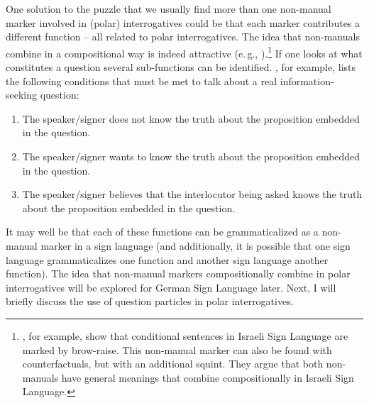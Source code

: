 One solution to the puzzle that we usually find more than one non-manual marker involved in (polar) interrogatives could be that each marker contributes a different function -- all related to polar interrogatives. The idea that non-manuals combine in a compositional way is indeed attractive (e.\,g., \citealt{nespor1999prosody, sandler2006sign, dachkovsky2009visual, herrmann2013modal}).\footnote{ \citet{dachkovsky2009visual}, for example, show that conditional sentences in Israeli Sign Language are marked by brow-raise. This non-manual marker can also be found with counterfactuals, but with an additional squint. They argue that both non-manuals have general meanings that combine compositionally in Israeli Sign Language.} If one looks at what constitutes a question several sub-functions can be identified. \citet[4]{dayal2016questions}, for example, lists the following conditions that must be met to talk about a real information-seeking question:

\begin{enumerate}[itemsep=0pt]
	\item The speaker/signer does not know the truth about the proposition embedded in the question.
	\item The speaker/signer wants to know the truth about the proposition embedded in the question.
	\item The speaker/signer believes that the interlocutor being asked knows the truth about the proposition embedded in the question.
\end{enumerate}


\noindent It may well be that each of these functions can be grammaticalized as a non-manual marker in a sign language (and additionally, it is possible that one sign language grammaticalizes one function and another sign language another function). The idea that non-manual markers compositionally combine in polar interrogatives will be explored for German Sign Language later. Next, I will briefly discuss the use of question particles in polar interrogatives.

